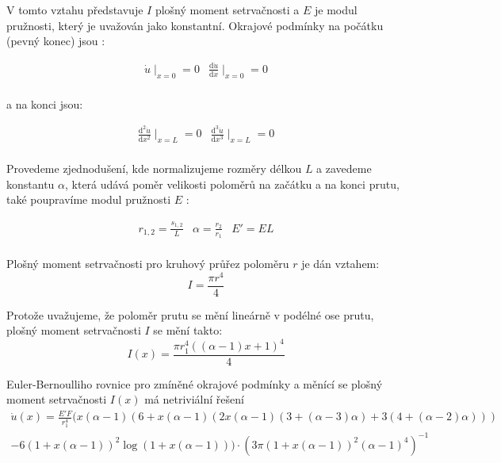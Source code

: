 V tomto vztahu představuje $I$ plošný moment setrvačnosti a $E$ je modul pružnosti, který je uvažován jako konstantní. Okrajové podmínky na počátku (pevný konec) jsou :

\begin{equation}
\begin{array}{cc}
\dot{u} \mid _{x=0} = 0 & \frac{\mathrm{d} \dot{u} }{\mathrm{d} x}\mid _{x=0} = 0 \\
\end{array}
\end{equation}

a na konci jsou:

\begin{equation}
\begin{array}{cc}
\frac{\mathrm{d}^2 \dot{u} }{\mathrm{d} x^2} \mid _{x=L} = 0 & \frac{\mathrm{d}^3 \dot{u} }{\mathrm{d} x^3}\mid _{x=L} = 0 \\
\end{array}
\end{equation}

Provedeme zjednodušení, kde normalizujeme rozměry délkou $L$ a zavedeme konstantu $\alpha$, která udává poměr velikosti poloměrů na začátku a na konci prutu, také poupravíme modul pružnosti $E$ :

\begin{equation}
\begin{array}{ccc}
r_{1,2} = \frac{s_{1,2}}{L} &\alpha = \frac{r_2}{r_1} & {E}'= EL\\
\end{array}
\end{equation}

Plošný moment setrvačnosti pro kruhový průřez poloměru $r$ je dán vztahem:
\begin{equation}
I = \frac{\pi r^4}{4}
\end{equation}

Protože uvažujeme, že poloměr prutu se mění lineárně v podélné ose prutu, plošný moment setrvačnosti $I$ se mění takto:
\begin{equation}
I(x) = \frac{\pi r_{1}^4((\alpha -1)x + 1)^4}{4}
\end{equation}

Euler-Bernoulliho rovnice pro zmíněné okrajové podmínky a měnící se plošný moment setrvačnosti $I(x)$ má netriviální řešení
\begin{multline}
\label{eq:EulerBernoulliFunction}
\dot{u}(x)=\frac{{E}'F}{r_{1}^4}(x(\alpha-1)(6+x(\alpha-1)(2x(\alpha-1)(3+(\alpha-3)\alpha)+3(4+(\alpha-2)\alpha)))\\
 - 6 (1+x(\alpha-1))^2 \log (1+x(\alpha-1))) \cdot  (3\pi(1+x(\alpha-1))^2(\alpha-1)^4)^{-1}
\end{multline}

